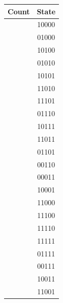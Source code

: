 \documentclass{article}
\begin{document}
\begin{center}
\begin{tabular}{c|c}
Count & State \\ \hline
[0] & 10000 \\ \hline
[1] & 01000 \\ \hline
[2] & 10100 \\ \hline
[3] & 01010 \\ \hline
[4] & 10101 \\ \hline
[5] & 11010 \\ \hline
[6] & 11101 \\ \hline
[7] & 01110 \\ \hline
[8] & 10111 \\ \hline
[9] & 11011 \\ \hline
[10] & 01101 \\ \hline
[11] & 00110 \\ \hline
[12] & 00011 \\ \hline
[13] & 10001 \\ \hline
[14] & 11000 \\ \hline
[15] & 11100 \\ \hline
[16] & 11110 \\ \hline
[17] & 11111 \\ \hline
[18] & 01111 \\ \hline
[19] & 00111 \\ \hline
[20] & 10011 \\ \hline
[21] & 11001 \\ \hline
\end{tabular}
\end{center}
\end{document}
